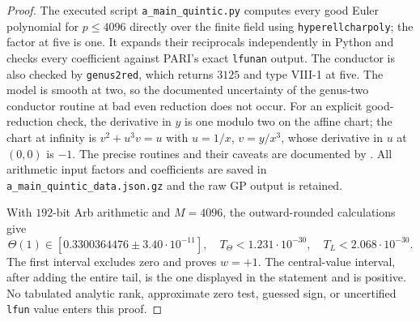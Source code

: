 \begin{proof}
The executed script \texttt{a\_main\_quintic.py} computes every good
Euler polynomial for $p\le4096$ directly over the finite field using
\texttt{hyperellcharpoly}; the factor at five is one. It expands their
reciprocals independently in Python and checks every coefficient against
PARI's exact \texttt{lfunan} output. The conductor is also checked by
\texttt{genus2red}, which returns $3125$ and type VIII-1 at five.
The model is smooth at two, so the documented uncertainty of the
genus-two conductor routine at bad even reduction does not occur.
For an explicit good-reduction check, the derivative in $y$ is one
modulo two on the affine chart; the chart at infinity is
$v^2+u^3v=u$ with $u=1/x$, $v=y/x^3$, whose derivative in $u$
at $(0,0)$ is $-1$. The precise routines and their caveats are documented
by \citet{AMPARIHyperell2026}.
All arithmetic input factors and coefficients are saved in
\texttt{a\_main\_quintic\_data.json.gz} and the raw GP output is retained.

With $192$-bit Arb arithmetic and $M=4096$, the outward-rounded
calculations give
\[
 \Theta(1)\in[0.3300364476\mathbin{\pm}3.40\cdot10^{-11}],
 \quad T_\Theta<1.231\cdot10^{-30},
 \quad T_L<2.068\cdot10^{-30}.
\]
The first interval excludes zero and proves $w=+1$. The central-value
interval, after adding the entire tail, is the one displayed in the
statement and is positive. No tabulated analytic rank, approximate zero
test, guessed sign, or uncertified \texttt{lfun} value enters this proof.
\end{proof}

